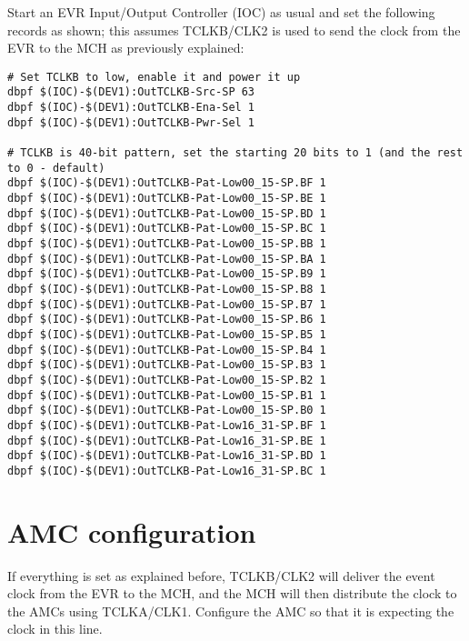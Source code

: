 \documentclass[11pt
  , a4paper
  , article
  , oneside
  , showtrims
]{memoir}
\begin{document}
Start an EVR Input/Output Controller (IOC) as usual and set the following records as shown; this assumes TCLKB/CLK2 is used to send the clock from the EVR to the MCH as previously explained:
\begin{lstlisting}[style=termstyle]
# Set TCLKB to low, enable it and power it up
dbpf $(IOC)-$(DEV1):OutTCLKB-Src-SP 63
dbpf $(IOC)-$(DEV1):OutTCLKB-Ena-Sel 1
dbpf $(IOC)-$(DEV1):OutTCLKB-Pwr-Sel 1

# TCLKB is 40-bit pattern, set the starting 20 bits to 1 (and the rest to 0 - default)
dbpf $(IOC)-$(DEV1):OutTCLKB-Pat-Low00_15-SP.BF 1
dbpf $(IOC)-$(DEV1):OutTCLKB-Pat-Low00_15-SP.BE 1
dbpf $(IOC)-$(DEV1):OutTCLKB-Pat-Low00_15-SP.BD 1
dbpf $(IOC)-$(DEV1):OutTCLKB-Pat-Low00_15-SP.BC 1
dbpf $(IOC)-$(DEV1):OutTCLKB-Pat-Low00_15-SP.BB 1
dbpf $(IOC)-$(DEV1):OutTCLKB-Pat-Low00_15-SP.BA 1
dbpf $(IOC)-$(DEV1):OutTCLKB-Pat-Low00_15-SP.B9 1
dbpf $(IOC)-$(DEV1):OutTCLKB-Pat-Low00_15-SP.B8 1
dbpf $(IOC)-$(DEV1):OutTCLKB-Pat-Low00_15-SP.B7 1
dbpf $(IOC)-$(DEV1):OutTCLKB-Pat-Low00_15-SP.B6 1
dbpf $(IOC)-$(DEV1):OutTCLKB-Pat-Low00_15-SP.B5 1
dbpf $(IOC)-$(DEV1):OutTCLKB-Pat-Low00_15-SP.B4 1
dbpf $(IOC)-$(DEV1):OutTCLKB-Pat-Low00_15-SP.B3 1
dbpf $(IOC)-$(DEV1):OutTCLKB-Pat-Low00_15-SP.B2 1
dbpf $(IOC)-$(DEV1):OutTCLKB-Pat-Low00_15-SP.B1 1
dbpf $(IOC)-$(DEV1):OutTCLKB-Pat-Low00_15-SP.B0 1
dbpf $(IOC)-$(DEV1):OutTCLKB-Pat-Low16_31-SP.BF 1
dbpf $(IOC)-$(DEV1):OutTCLKB-Pat-Low16_31-SP.BE 1
dbpf $(IOC)-$(DEV1):OutTCLKB-Pat-Low16_31-SP.BD 1
dbpf $(IOC)-$(DEV1):OutTCLKB-Pat-Low16_31-SP.BC 1
\end{lstlisting}


\section{AMC configuration}
If everything is set as explained before, TCLKB/CLK2 will deliver the event clock from the EVR to the MCH, and the MCH will then distribute the clock to the AMCs using TCLKA/CLK1. Configure the AMC so that it is expecting the clock in this line.\\


\clearpage


\end{document}
